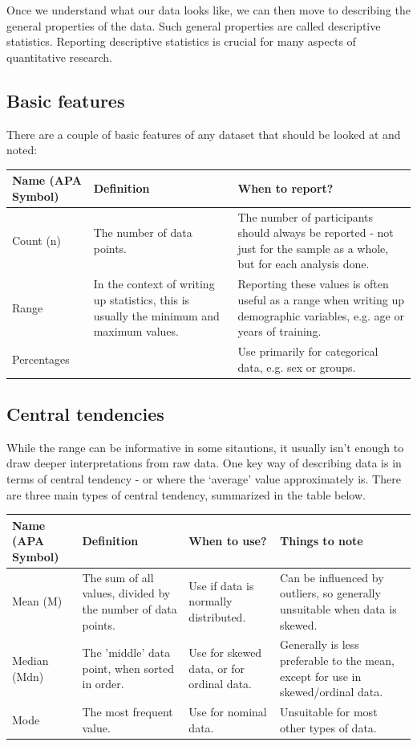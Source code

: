 \documentclass[
]{book}
\begin{document}
Once we understand what our data looks like, we can then move to describing the general properties of the data. Such general properties are called descriptive statistics. Reporting descriptive statistics is crucial for many aspects of quantitative research.

\hypertarget{basic-features}{%
\subsection{Basic features}\label{basic-features}}

There are a couple of basic features of any dataset that should be looked at and noted:

\begin{tabular}{l|l|l}
\hline
Name (APA Symbol) & Definition & When to report?\\
\hline
Count (n) & The number of data points. & The number of participants should always be reported - not just for the sample as a whole, but for each analysis done.\\
\hline
Range & In the context of writing up statistics, this is usually the minimum and maximum values. & Reporting these values is often useful as a range when writing up demographic variables, e.g. age or years of training.\\
\hline
Percentages &  & Use primarily for categorical data, e.g. sex or groups.\\
\hline
\end{tabular}

\hypertarget{central-tendencies}{%
\subsection{Central tendencies}\label{central-tendencies}}

While the range can be informative in some sitautions, it usually isn't enough to draw deeper interpretations from raw data. One key way of describing data is in terms of central tendency - or where the `average' value approximately is. There are three main types of central tendency, summarized in the table below.

\begin{tabular}{l|l|l|l}
\hline
Name (APA Symbol) & Definition & When to use? & Things to note\\
\hline
Mean (M) & The sum of all values, divided by the number of data points. & Use if data is normally distributed. & Can be influenced by outliers, so generally unsuitable when data is skewed.\\
\hline
Median (Mdn) & The 'middle' data point, when sorted in order. & Use for skewed data, or for ordinal data. & Generally is less preferable to the mean, except for use in skewed/ordinal data.\\
\hline
Mode & The most frequent value. & Use for nominal data. & Unsuitable for most other types of data.\\
\hline
\end{tabular}
\end{document}
